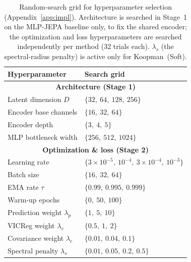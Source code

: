 \begin{table}[ht]
\caption{Random-search grid for hyperparameter selection (Appendix~\ref{app:impl}). Architecture is searched in Stage~1 on the MLP-JEPA baseline only, to fix the shared encoder; the optimization and loss hyperparameters are searched independently per method (32 trials each). $\lambda_s$ (the spectral-radius penalty) is active only for Koopman~(Soft).}
\label{tab:search_space}
\centering
\small
\begin{tabular}{@{}ll@{}}
\toprule
\textbf{Hyperparameter} & \textbf{Search grid} \\
\midrule
\multicolumn{2}{c}{\textbf{Architecture (Stage 1)}} \\
\midrule
Latent dimension $D$          & $\{32,\ 64,\ 128,\ 256\}$ \\
Encoder base channels         & $\{16,\ 32,\ 64\}$ \\
Encoder depth                 & $\{3,\ 4,\ 5\}$ \\
MLP bottleneck width          & $\{256,\ 512,\ 1024\}$ \\
\midrule
\multicolumn{2}{c}{\textbf{Optimization \& loss (Stage 2)}} \\
\midrule
Learning rate                 & $\{3{\times}10^{-5},\ 10^{-4},\ 3{\times}10^{-4},\ 10^{-3}\}$ \\
Batch size                    & $\{16,\ 32,\ 64\}$ \\
EMA rate $\tau$               & $\{0.99,\ 0.995,\ 0.999\}$ \\
Warm-up epochs                & $\{0,\ 50,\ 100\}$ \\
Prediction weight $\lambda_p$ & $\{1,\ 5,\ 10\}$ \\
VICReg weight $\lambda_v$     & $\{0.5,\ 1,\ 2\}$ \\
Covariance weight $\lambda_c$ & $\{0.01,\ 0.04,\ 0.1\}$ \\
Spectral penalty $\lambda_s$  & $\{0.01,\ 0.05,\ 0.2,\ 0.5\}$ \\
\bottomrule
\end{tabular}
\end{table}
